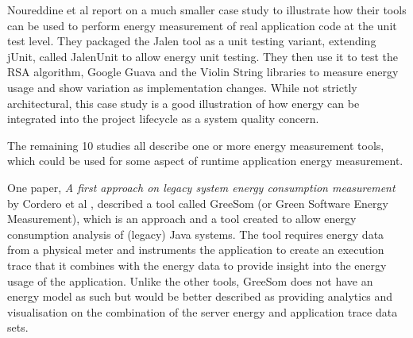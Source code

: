 Noureddine et al report on a much smaller case study to illustrate how their tools can be used to perform energy measurement of real application code at the unit test level.  They packaged the Jalen tool as a unit testing variant, extending jUnit, called JalenUnit to allow energy unit testing.  They then use it to test the RSA algorithm, Google Guava and the Violin String libraries to measure energy usage and show variation as implementation changes.  While not strictly architectural, this case study is a good illustration of how energy can be integrated into the project lifecycle as a system quality concern.

The remaining 10 studies all describe one or more energy measurement tools, which could be used for some aspect of runtime application energy measurement.

One paper, \emph{A first approach on legacy system energy consumption measurement} by Cordero et al \cite{cordero2015-legacyenergy}, described a tool called GreeSom (or Green Software Energy Measurement), which is an approach and a tool created to allow energy consumption analysis of (legacy) Java systems.  The tool requires energy data from a physical meter and instruments the application to create an execution trace that it combines with the energy data to provide insight into the energy usage of the application.  Unlike the other tools, GreeSom does not have an energy model as such but would be better described as providing analytics and visualisation on the combination of the server energy and application trace data sets. 

